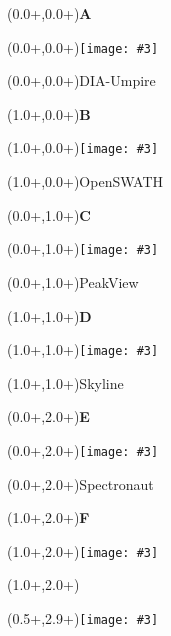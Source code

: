 \documentclass{article}
\newlength{\panelWidth} \newlength{\panelHeight}
\newlength{\labXshift} \newlength{\labYshift}
\newlength{\picXshift} \newlength{\picYshift}
\newlength{\txtXshift} \newlength{\txtYshift}
\newlength{\picWidth}
\newcommand{\txt}[3]{\begin{textblock*}{\panelWidth}(#1+\txtXshift,#2+\txtYshift){#3}\end{textblock*}}
\newcommand{\lab}[3]{\begin{textblock*}{\panelWidth}(#1+\labXshift,#2+\labYshift)\textbf{\LARGE #3}\end{textblock*}}
\newcommand{\pic}[3]{\begin{textblock*}{\panelWidth}(#1+\picXshift,#2+\picYshift)\texttt{[image: \#3]}\end{textblock*}}
\newcommand{\fig}[5]{ \lab{#1}{#2}{#3} \pic{#1}{#2}{#4} \txt{#1}{#2}{#5} }
\begin{document}

\fig{0.0\panelWidth}{0.0\panelHeight}{A}{./DIAumpire_peptides_r1.pdf}{DIA-Umpire}
\fig{1.0\panelWidth}{0.0\panelHeight}{B}{./openSWATH_peptides_r1.pdf}{OpenSWATH}
\fig{0.0\panelWidth}{1.0\panelHeight}{C}{./PeakView_peptides_r1.pdf}{PeakView}
\fig{1.0\panelWidth}{1.0\panelHeight}{D}{./Skyline_peptides_r1.pdf}{Skyline}
\fig{0.0\panelWidth}{2.0\panelHeight}{E}{./Spectronaut_peptides_r1.pdf}{Spectronaut}
\fig{1.0\panelWidth}{2.0\panelHeight}{F}{./missing_values_peptides_r1.pdf}{}
\pic{0.5\panelWidth}{2.9\panelHeight}{./species_legend_h.pdf}
\end{document}
